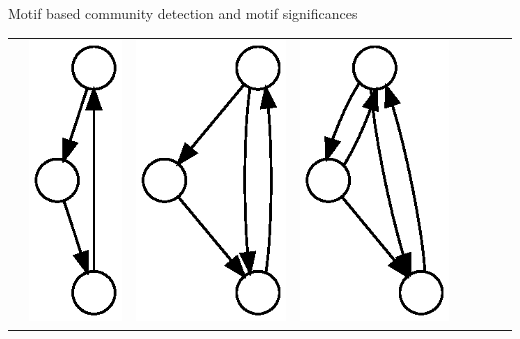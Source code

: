 \documentclass[unknownkeysallowed]{beamer}
\begin{document}
\begin{frame}{Motif based community detection and motif significances}
  \centering
  \begin{tabular}{l|lllllll}
    &
    \includegraphics[height=0.10\textheight]{M1-plain} &
    \includegraphics[height=0.10\textheight]{M2-plain} &
    \includegraphics[height=0.10\textheight]{M3-plain} &

\end{tabular}
\end{frame}
\end{document}
